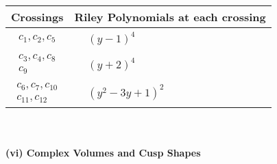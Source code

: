 \documentclass[1p]{elsarticle_modified}
\theoremstyle{definition}
\begin{document}
\begin{tabular}{m{50pt}|m{274pt}}
Crossings & \hspace{64pt}Riley Polynomials at each crossing \\
\hline $$\begin{aligned}c_{1},c_{2},c_{5}\end{aligned}$$&$\begin{aligned}
&(y-1)^4
\end{aligned}$\\
\hline $$\begin{aligned}c_{3},c_{4},c_{8}\\c_{9}\end{aligned}$$&$\begin{aligned}
&(y+2)^4
\end{aligned}$\\
\hline $$\begin{aligned}c_{6},c_{7},c_{10}\\c_{11},c_{12}\end{aligned}$$&$\begin{aligned}
&(y^2-3 y+1)^2
\end{aligned}$\\
\hline
\end{tabular}\\~\\
\newpage\flushleft \textbf{(vi) Complex Volumes and Cusp Shapes}
\end{document}
